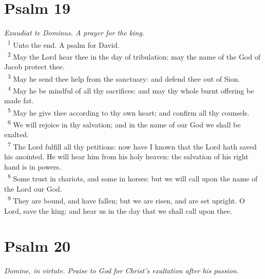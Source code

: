 \documentclass[a5paper,12pt]{article}
\begin{document}
\begin{multicols*}{2}
\section{Psalm 19}
\label{sec:orgd3d5c29}
\emph{Exaudiat te Dominus. A prayer for the king.}\\

~\textsuperscript{1} Unto the end. A psalm for David.\\
~\textsuperscript{2} May the Lord hear thee in the day of tribulation: may the name of the God of Jacob protect thee.\\
~\textsuperscript{3} May he send thee help from the sanctuary: and defend thee out of Sion.\\
~\textsuperscript{4} May he be mindful of all thy sacrifices: and may thy whole burnt offering be made fat.\\
~\textsuperscript{5} May he give thee according to thy own heart; and confirm all thy counsels.\\
~\textsuperscript{6} We will rejoice in thy salvation; and in the name of our God we shall be exalted.\\
~\textsuperscript{7} The Lord fulfill all thy petitions: now have I known that the Lord hath saved his anointed. He will hear him from his holy heaven: the salvation of his right hand is in powers.\\
~\textsuperscript{8} Some trust in chariots, and some in horses: but we will call upon the name of the Lord our God.\\
~\textsuperscript{9} They are bound, and have fallen; but we are risen, and are set upright. O Lord, save the king: and hear us in the day that we shall call upon thee.\\

\section{Psalm 20}
\label{sec:orgf9d2da5}
\emph{Domine, in virtute. Praise to God for Christ's exaltation after his passion.}\\


\end{multicols*}
\end{document}
